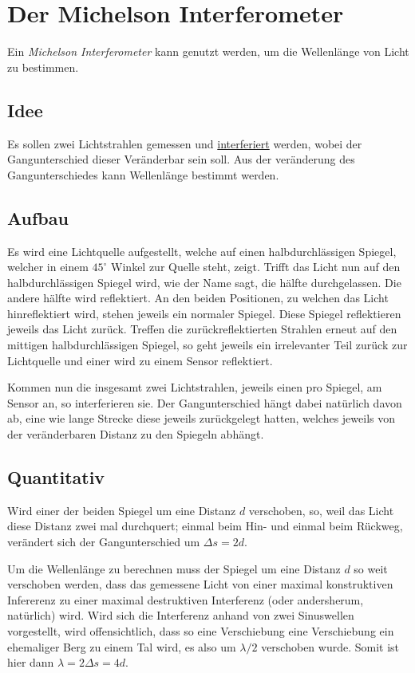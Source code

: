 \documentclass{article}
\begin{document}
\section{Der Michelson Interferometer} 
Ein \emph{Michelson Interferometer} kann genutzt werden, um die Wellenlänge von Licht zu bestimmen.
 
\subsection{Idee} 
Es sollen zwei Lichtstrahlen gemessen und \hyperref[Interferenz]{interferiert} werden, wobei der Gangunterschied dieser Veränderbar sein soll. Aus der veränderung des Gangunterschiedes kann Wellenlänge bestimmt werden.
 
\subsection{Aufbau} 
Es wird eine Lichtquelle aufgestellt, welche auf einen halbdurchlässigen Spiegel, welcher in einem $45^\circ$ Winkel zur Quelle steht, zeigt. Trifft das Licht nun auf den halbdurchlässigen Spiegel wird, wie der Name sagt, die hälfte durchgelassen. Die andere hälfte wird reflektiert. An den beiden Positionen, zu welchen das Licht hinreflektiert wird, stehen jeweils ein normaler Spiegel. Diese Spiegel reflektieren jeweils das Licht zurück. Treffen die zurückreflektierten Strahlen erneut auf den mittigen halbdurchlässigen Spiegel, so geht jeweils ein irrelevanter Teil zurück zur Lichtquelle und einer wird zu einem Sensor reflektiert.
 
Kommen nun die insgesamt zwei Lichtstrahlen, jeweils einen pro Spiegel, am Sensor an, so interferieren sie. Der Gangunterschied hängt dabei natürlich davon ab, eine wie lange Strecke diese jeweils zurückgelegt hatten, welches jeweils von der veränderbaren Distanz zu den Spiegeln abhängt. %
 
\subsection{Quantitativ} 
Wird einer der beiden Spiegel um eine Distanz $d$ verschoben, so, weil das Licht diese Distanz zwei mal durchquert; einmal beim Hin- und einmal beim Rückweg, verändert sich der Gangunterschied um $\Delta s = 2d$.
 
Um die Wellenlänge zu berechnen muss der Spiegel um eine Distanz $d$ so weit verschoben werden, dass das gemessene Licht von einer maximal konstruktiven Infererenz zu einer maximal destruktiven Interferenz (oder andersherum, natürlich) wird. Wird sich die Interferenz anhand von zwei Sinuswellen vorgestellt, wird offensichtlich, dass so eine Verschiebung eine Verschiebung ein ehemaliger Berg zu einem Tal wird, es also um $\lambda / 2$ verschoben wurde. Somit ist hier dann $\lambda = 2 \Delta s = 4d$.  
\end{document}
